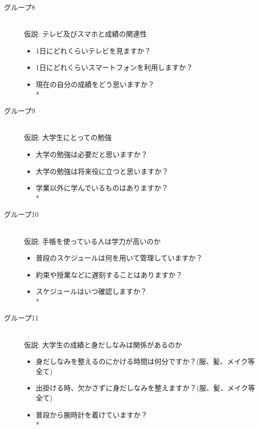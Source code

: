 \begin{description}
\item[グループ8]\mbox{}\\
仮説: テレビ及びスマホと成績の関連性
	    \begin{itemize}
   	\item 1日にどれくらいテレビを見ますか？
   	\item 1日にどれくらいスマートフォンを利用しますか？
   	\item 現在の自分の成績をどう思いますか？   \vspace{0.1in} \\*
	\end{itemize}

 \item[グループ9]\mbox{}\\
 仮説: 大学生にとっての勉強
	    \begin{itemize}
   	\item 大学の勉強は必要だと思いますか？
   	\item 大学の勉強は将来役に立つと思いますか？
   	\item 学業以外に学んでいるものはありますか？   \vspace{0.1in} \\*
	\end{itemize}

 \item[グループ10]\mbox{}\\
 仮説: 手帳を使っている人は学力が高いのか
	    \begin{itemize}
   	\item 普段のスケジュールは何を用いて管理していますか？
   	\item 約束や授業などに遅刻することはありますか？
   	\item スケジュールはいつ確認しますか？   \vspace{0.1in} \\*
	\end{itemize}
	
 \item[グループ11]\mbox{}\\
 仮説: 大学生の成績と身だしなみは関係があるのか
	    \begin{itemize}
   	\item 身だしなみを整えるのにかける時間は何分ですか？(服、髪、メイク等全て)
   	\item 出掛ける時、欠かさずに身だしなみを整えますか？(服、髪、メイク等全て)
   	\item 普段から腕時計を着けていますか？   \vspace{0.1in} \\*
	\end{itemize}


\end{description}

